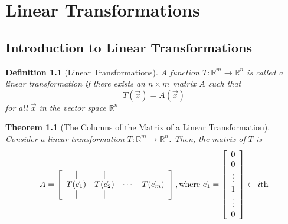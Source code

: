 \documentclass[10pt]{report}
\newtheorem{thm2}{Theorem}[section]
\newtheorem{def2}{Definition}[section]
\begin{document}
\chapter{Linear Transformations}
\section{Introduction to Linear Transformations}
\begin{def2}[Linear Transformations]
A function $T:\mathbb{R}^m\to \mathbb{R}^n$ is called a linear transformation if there exists an $n\times m$ matrix $A$ such that
$$T(\vec{x}) = A(\vec{x})$$
for all $\vec{x}$ in the vector space $\mathbb{R}^n$
\end{def2}
\begin{thm2}[The Columns of the Matrix of a Linear Transformation]
Consider a linear transformation $T: \mathbb{R}^m \to\mathbb{R}^n$. Then, the matrix of $T$ is
$$A=\left[\begin{array}{c c c c}
| & | & & |\\
T(\vec{e}_1) & T(\vec{e}_2) & \cdots & T(\vec{e}_m)\\
| & | & & |
\end{array}\right], \text{where } \vec{e}_1 = \left[ \begin{array}{c}
0\\
0\\
\vdots \\
1\\
\vdots \\
0
\end{array}\right] \leftarrow i\text{th}$$
\end{thm2}
\end{document}
